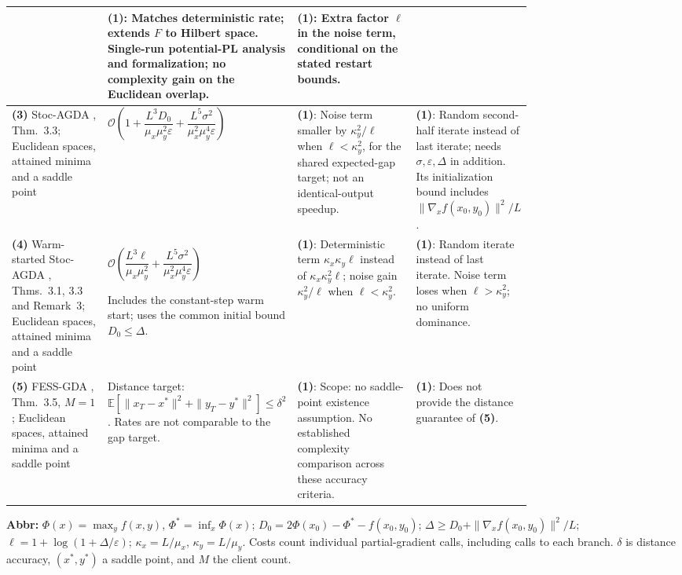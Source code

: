 \begin{table}[tp]
\begin{threeparttable}
\begin{tabularx}{\linewidth}{@{}>{\raggedright\arraybackslash}p{0.20\linewidth}>{\raggedright\arraybackslash}p{0.32\linewidth}>{\raggedright\arraybackslash}p{0.25\linewidth}>{\raggedright\arraybackslash}X@{}}
& \textbf{(1)}: Matches deterministic rate; extends $F$ to Hilbert space. Single-run potential-PL analysis and formalization; no complexity gain on the Euclidean overlap.
& \textbf{(1)}: Extra factor $\ell$ in the noise term, conditional on the stated restart bounds. \\
\midrule
\textbf{(3)} Stoc-AGDA \citep{stplYang2020}, Thm.~3.3; Euclidean spaces, attained minima and a saddle point
& $\mathcal{O}\!\left(1+\dfrac{L^3D_0}{\mu_x\mu_y^2\varepsilon}+\dfrac{L^5\sigma^2}{\mu_x^2\mu_y^4\varepsilon}\right)$
& \textbf{(1)}: Noise term smaller by $\kappa_y^2/\ell$ when $\ell<\kappa_y^2$, for the shared expected-gap target; not an identical-output speedup.
& \textbf{(1)}: Random second-half iterate instead of last iterate; needs $\sigma,\varepsilon,\Delta$ in addition. Its initialization bound includes $\|\nabla_x f(x_0,y_0)\|^2/L$. \\
\midrule
\textbf{(4)} Warm-started Stoc-AGDA \citep{stplYang2020}, Thms.~3.1, 3.3 and Remark~3; Euclidean spaces, attained minima and a saddle point
& $\mathcal{O}\!\left(\dfrac{L^3\ell}{\mu_x\mu_y^2}+\dfrac{L^5\sigma^2}{\mu_x^2\mu_y^4\varepsilon}\right)$\par Includes the constant-step warm start; uses the common initial bound $D_0\le\Delta$.
& \textbf{(1)}: Deterministic term $\kappa_x\kappa_y\ell$ instead of $\kappa_x\kappa_y^2\ell$; noise gain $\kappa_y^2/\ell$ when $\ell<\kappa_y^2$.
& \textbf{(1)}: Random iterate instead of last iterate. Noise term loses when $\ell>\kappa_y^2$; no uniform dominance. \\
\midrule
\textbf{(5)} FESS-GDA \citep{stplShen2024v2}, Thm.~3.5, $M=1$; Euclidean spaces, attained minima and a saddle point
& Distance target: $\mathbb{E}[\|x_T-x^*\|^2+\|y_T-y^*\|^2]\le\delta^2$. Rates are not comparable to the gap target.
& \textbf{(1)}: Scope: no saddle-point existence assumption. No established complexity comparison across these accuracy criteria.
& \textbf{(1)}: Does not provide the distance guarantee of \textbf{(5)}. \\
\bottomrule
\end{tabularx}
\begin{tablenotes}[flushleft]\footnotesize
\item[] \textbf{Abbr:} $\Phi(x)=\max_y f(x,y)$, $\Phi^*=\inf_x\Phi(x)$; $D_0=2\Phi(x_0)-\Phi^*-f(x_0,y_0)$; $\Delta\ge D_0+\|\nabla_x f(x_0,y_0)\|^2/L$; $\ell=1+\log(1+\Delta/\varepsilon)$; $\kappa_x=L/\mu_x$, $\kappa_y=L/\mu_y$. Costs count individual partial-gradient calls, including calls to each branch. $\delta$ is distance accuracy, $(x^*,y^*)$ a saddle point, and $M$ the client count.
\end{tablenotes}
\end{threeparttable}
\end{table}
\clearpage
